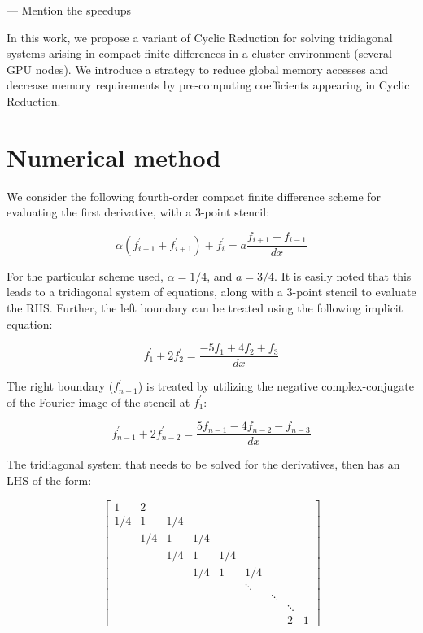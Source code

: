 \documentclass{article}
\begin{document}
    --- Mention the speedups

    In this work, we propose a variant of Cyclic Reduction for solving
    tridiagonal systems arising in compact finite differences
    in a cluster environment (several GPU nodes).
    We introduce a strategy to
    reduce global memory accesses and decrease memory requirements by
    pre-computing coefficients appearing in Cyclic Reduction.


\section{Numerical method}

    We consider the following fourth-order
    compact finite difference scheme for evaluating the first derivative,
    with a 3-point stencil:

    \begin{equation}
        \alpha(f^{\prime}_{i-1} + f^{\prime}_{i+1}) + f^{\prime}_i
        =
        a\frac{f_{i+1} - f_{i-1}}{dx}
    \end{equation}

    For the particular scheme used, $\alpha = 1/4$,
    and $ a = 3/4 $.
    It is easily noted that this leads to a tridiagonal system of equations,
    along with a 3-point stencil to evaluate the RHS.
    Further, the left boundary can be treated using the following implicit equation:

    \begin{equation}
        f^{\prime}_1 + 2f^{\prime}_2 = \frac{-5f_1 + 4f_2 + f_3}{dx}
    \end{equation}

    The right boundary ($f^{\prime}_{n-1}$) is treated by utilizing
    the negative complex-conjugate of the Fourier image of the stencil
    at $f^{\prime}_1$:

    \begin{equation}
        f^{\prime}_{n-1} + 2f^{\prime}_{n-2}
        =
        \frac{5f_{n-1} - 4f_{n-2} - f_{n-3}}{dx}
    \end{equation}

    The tridiagonal system that needs to be solved for the derivatives,
    then has an LHS of the form:

    \[ %
     \begin{bmatrix}
         1&2\\
         1/4&1&1/4\\
         &1/4&1&1/4\\
         &&1/4&1&1/4\\
         &&&1/4&1&1/4\\
         &&&&&\ddots\\
         &&&&&&\ddots\\
         &&&&&&&\ddots\\
         &&&&&&&2&1
      \end{bmatrix}
    \]
\end{document}
